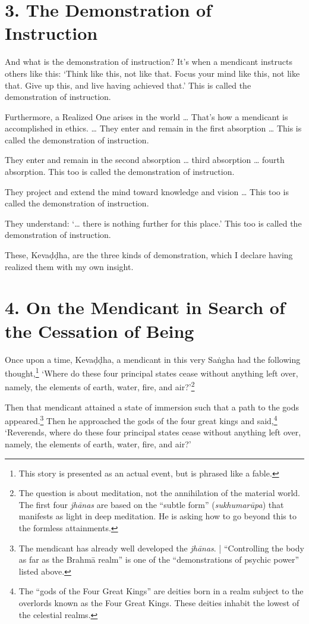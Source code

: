 \documentclass[12pt,openany]{book}%
\begin{document}
\section*{3. The Demonstration of Instruction }

And what is the demonstration of instruction? It’s when a mendicant instructs others like this: ‘Think like this, not like that. Focus your mind like this, not like that. Give up this, and live having achieved that.’ This is called the demonstration of instruction. 

Furthermore, a Realized One arises in the world … That’s how a mendicant is accomplished in ethics. … They enter and remain in the first absorption … This is called the demonstration of instruction. 

They enter and remain in the second absorption … third absorption … fourth absorption. This too is called the demonstration of instruction. 

They project and extend the mind toward knowledge and vision … This too is called the demonstration of instruction. 

They understand: ‘… there is nothing further for this place.’ This too is called the demonstration of instruction. 

These, \textsanskrit{Kevaḍḍha}, are the three kinds of demonstration, which I declare having realized them with my own insight. 

\section*{4. On the Mendicant in Search of the Cessation of Being }

Once upon a time, \textsanskrit{Kevaḍḍha}, a mendicant in this very \textsanskrit{Saṅgha} had the following thought,\footnote{This story is presented as an actual event, but is phrased like a fable. } ‘Where do these four principal states cease without anything left over, namely, the elements of earth, water, fire, and air?’\footnote{The question is about meditation, not the annihilation of the material world. The first four \textit{\textsanskrit{jhānas}} are based on the “subtle form” (\textit{\textsanskrit{sukhumarūpa}}) that manifests as light in deep meditation. He is asking how to go beyond this to the formless attainments. } 

Then that mendicant attained a state of immersion such that a path to the gods appeared.\footnote{The mendicant has already well developed the \textit{\textsanskrit{jhānas}}. | “Controlling the body as far as the \textsanskrit{Brahmā} realm” is one of the “demonstrations of psychic power” listed above. } Then he approached the gods of the four great kings and said,\footnote{The “gods of the Four Great Kings” are deities born in a realm subject to the overlords known as the Four Great Kings. These deities inhabit the lowest of the celestial realms. } ‘Reverends, where do these four principal states cease without anything left over, namely, the elements of earth, water, fire, and air?’ 
\end{document}
